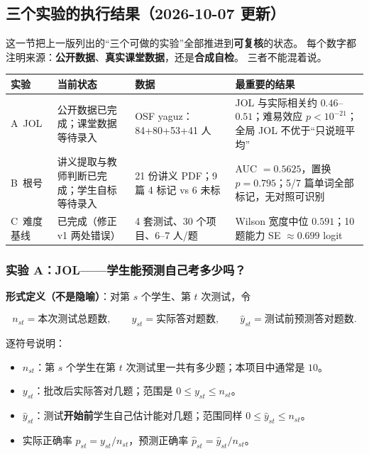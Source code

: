 \documentclass[UTF8,a4paper,11pt]{ctexart}
\begin{document}
\subsection{三个实验的执行结果（2026-10-07 更新）}

这一节把上一版列出的“三个可做的实验”全部推进到\textbf{可复核}的状态。
每个数字都注明来源：\textbf{公开数据}、\textbf{真实课堂数据}，还是\textbf{合成自检}。
三者不能混着说。

\begin{center}
\begin{longtable}{@{}p{1.8cm}p{3.0cm}p{4.1cm}p{5.4cm}@{}}
\toprule
\textbf{实验} & \textbf{当前状态} & \textbf{数据} & \textbf{最重要的结果} \\
\midrule
A\ JOL & 公开数据已完成；课堂数据等待录入 & OSF yaguz：84+80+53+41 人 & JOL 与实际相关约 $0.46$--$0.51$；难易效应 $p<10^{-21}$；全局 JOL 不优于“只说班平均” \\
B\ 根号 & 讲义提取与教师判断已完成；学生自标等待录入 & 21 份讲义 PDF；9 篇 4 标记 vs 6 未标 & AUC $=0.5625$，置换 $p=0.795$；5/7 篇单词全部标记，无对照可识别 \\
C\ 难度基线 & 已完成（修正 v1 两处错误） & 4 套测试、30 个项目、6--7 人/题 & Wilson 宽度中位 $0.591$；10 题能力 SE $\approx 0.699$ logit \\
\bottomrule
\end{longtable}
\end{center}

\subsubsection{实验 A：JOL——学生能预测自己考多少吗？}

\textbf{形式定义（不是隐喻）}：对第 $s$ 个学生、第 $t$ 次测试，令

\begin{equation}
n_{st} = \text{本次测试总题数},\qquad
y_{st} = \text{实际答对题数},\qquad
\hat y_{st} = \text{测试前预测答对题数}.
\end{equation}

逐符号说明：

\begin{itemize}[leftmargin=2em]
\item $n_{st}$：第 $s$ 个学生在第 $t$ 次测试里一共有多少题；本项目中通常是 $10$。
\item $y_{st}$：批改后实际答对几题；范围是 $0\le y_{st}\le n_{st}$。
\item $\hat y_{st}$：测试\textbf{开始前}学生自己估计能对几题；范围同样 $0\le \hat y_{st}\le n_{st}$。
\item 实际正确率 $p_{st}=y_{st}/n_{st}$，预测正确率 $\hat p_{st}=\hat y_{st}/n_{st}$。
\end{itemize}
\end{document}
